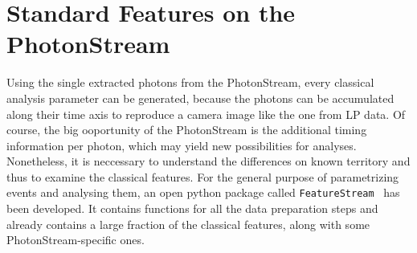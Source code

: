 \section{Standard Features on the PhotonStream}
%
Using the single extracted photons from the PhotonStream, every classical
analysis parameter can be generated, because the photons can be accumulated
along their time axis to reproduce a camera image like the one from LP data. Of
course, the big ooportunity of the PhotonStream is the additional timing
information per photon, which may yield new possibilities for analyses.
Nonetheless, it is neccessary to understand the differences on known territory
and thus to examine the classical features. For the general purpose of
parametrizing events and analysing them, an open python package called
\texttt{FeatureStream}~\cite{FeatureStream} has been developed. It contains
functions for all the data preparation steps and already contains a large
fraction of the classical features, along with some PhotonStream-specific ones.

